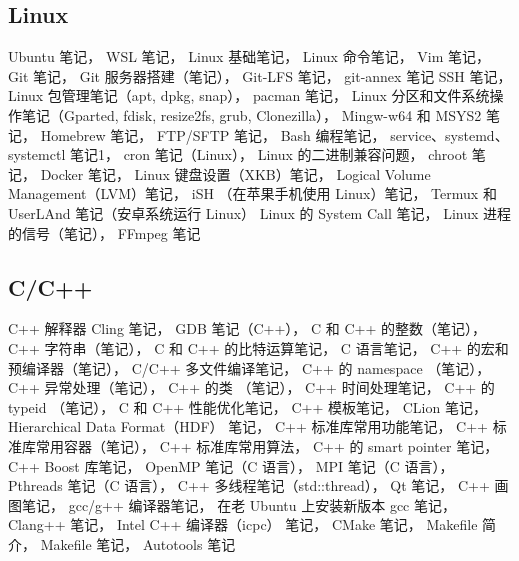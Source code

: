 \subsection{Linux}
Ubuntu 笔记，
WSL 笔记，
Linux 基础笔记，
Linux 命令笔记，
Vim 笔记，
Git 笔记，
Git 服务器搭建（笔记），
Git-LFS 笔记，
git-annex 笔记
SSH 笔记，
Linux 包管理笔记（apt, dpkg, snap），
pacman 笔记，
Linux 分区和文件系统操作笔记（Gparted, fdisk, resize2fs, grub, Clonezilla），
Mingw-w64 和 MSYS2 笔记，
Homebrew 笔记，
FTP/SFTP 笔记，
Bash 编程笔记，
service、systemd、systemctl 笔记1，
cron 笔记（Linux），
Linux 的二进制兼容问题，
chroot 笔记，
Docker 笔记，
Linux 键盘设置（XKB）笔记，
Logical Volume Management（LVM）笔记，
iSH （在苹果手机使用 Linux）笔记，
Termux 和 UserLAnd 笔记（安卓系统运行 Linux）
Linux 的 System Call 笔记，
Linux 进程的信号（笔记），
FFmpeg 笔记

\subsection{C/C++}
C++ 解释器 Cling 笔记，
GDB 笔记（C++），
C 和 C++ 的整数（笔记），
C++ 字符串（笔记），
C 和 C++ 的比特运算笔记，
C 语言笔记，
C++ 的宏和预编译器（笔记），
C/C++ 多文件编译笔记，
C++ 的 namespace （笔记），
C++ 异常处理（笔记），
C++ 的类 （笔记），
C++ 时间处理笔记，
C++ 的 typeid （笔记），
C 和 C++ 性能优化笔记，
C++ 模板笔记，
CLion 笔记，
Hierarchical Data Format（HDF） 笔记，
C++ 标准库常用功能笔记，
C++ 标准库常用容器（笔记），
C++ 标准库常用算法，
C++ 的 smart pointer 笔记，
C++ Boost 库笔记，
OpenMP 笔记（C 语言），
MPI 笔记（C 语言），
Pthreads 笔记（C 语言），
C++ 多线程笔记（std::thread），
Qt 笔记，
C++ 画图笔记，
gcc/g++ 编译器笔记，
在老 Ubuntu 上安装新版本 gcc 笔记，
Clang++ 笔记，
Intel C++ 编译器（icpc） 笔记，
CMake 笔记，
Makefile 简介，
Makefile 笔记，
Autotools 笔记

